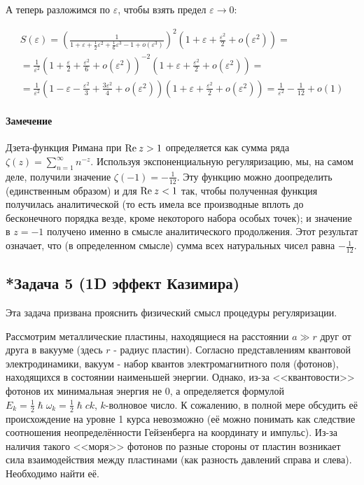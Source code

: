 \documentclass[a4paper,12pt]{article}
\begin{document}
\noindent
А теперь разложимся по $\varepsilon$, чтобы взять предел $\varepsilon\to0$:

\begin{multline*}
S\left(\varepsilon\right)=\left(\frac{1}{1+\varepsilon+\frac{1}{2}\varepsilon^{2}+\frac{1}{6}\varepsilon^{3}-1+o(\varepsilon^{3})}\right)^{2}\left(1+\varepsilon+\frac{\varepsilon^{2}}{2}+o(\varepsilon^{2})\right)=\\
=\frac{1}{\varepsilon^{2}}\left(1+\frac{\varepsilon}{2}+\frac{\varepsilon^{2}}{6}+o(\varepsilon^{2})\right)^{-2}\left(1+\varepsilon+\frac{\varepsilon^{2}}{2}+o(\varepsilon^{2})\right)=\\
=\frac{1}{\varepsilon^{2}}\left(1-\varepsilon-\frac{\varepsilon^{2}}{3}+\frac{3\varepsilon^{2}}{4}+o(\varepsilon^{2})\right)\left(1+\varepsilon+\frac{\varepsilon^{2}}{2}+o(\varepsilon^{2})\right)=\frac{1}{\varepsilon^{2}}-\frac{1}{12}+o(1)
\end{multline*}



\paragraph{Замечение}

Дзета-функция Римана при ${\rm Re}\:z>1$ определяется как сумма ряда
$\zeta(z)=\sum_{n=1}^{\infty}n^{-z}$. Используя экспоненциальную
регуляризацию, мы, на самом деле, получили значение $\zeta(-1)=-\frac{1}{12}$.
Эту функцию можно доопределить (единственным образом) и для ${\rm Re}\:z<1$
так, чтобы полученная функция получилась аналитической (то есть имела
все производные вплоть до бесконечного порядка везде, кроме некоторого
набора особых точек); и значение в $z=-1$ получено именно в смысле
аналитического продолжения. Этот результат означает, что (в определенном
смысле) сумма всех натуральных чисел равна $-\frac{1}{12}$.

\subsection*{*Задача 5 (1D эффект Казимира)}

Эта задача призвана прояснить физический смысл процедуры регуляризации.

\noindent
Рассмотрим металлические пластины, находящиеся на расстоянии $a\gg r$ друг от друга в вакууме (здесь $r$ - радиус пластин). Согласно представлениям квантовой электродинамики, вакуум - набор квантов электромагнитного поля (фотонов), находящихся в состоянии наименьшей энергии. Однако, из-за <<квантовости>> фотонов их минимальная энергия не $0$, а определяется формулой $E_{k}=\frac{1}{2}\hslash\omega_k=\frac{1}{2}\hslash ck$, $k$-волновое число. К сожалению, в полной мере обсудить её происхождение на уровне 1 курса невозможно (её можно понимать как следствие соотношения неопределённости Гейзенберга на координату и импульс). Из-за наличия такого <<моря>> фотонов по разные стороны от пластин возникает сила взаимодействия между пластинами (как разность давлений справа и слева). Необходимо найти её.
\end{document}
